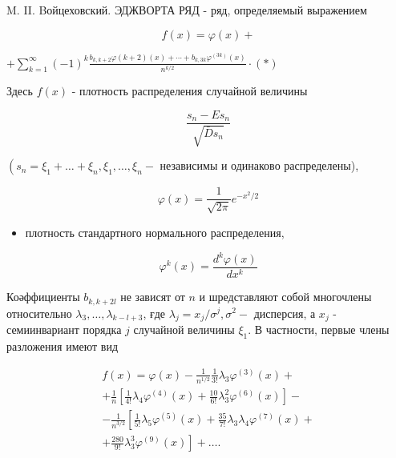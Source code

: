 \documentclass[10pt]{article}
\begin{document}
M. II. Bойцеховский. ЭДЖВОРТА РЯД - ряд, определяемый выражением



\[

f(x)=\varphi(x)+

\]



$+\sum_{k=1}^{\infty}(-1)^{k} \frac{b_{k, k+2} \varphi(k+2)(x)+\cdots+b_{k, 3 k} \varphi^{(3 k)}(x)}{n^{k / 2}} \cdot(*)$



Здесь $f(x)$ - плотность распределения случайной величины



\[

\frac{s_{n}-E s_{n}}{\sqrt{\bar{D} s_{n}}}

\]



$\left(s_{n}=\xi_{1}+\ldots+\xi_{n}, \xi_{1}, \ldots, \xi_{n}-\right.$ независимы и одинаково распределены),



\[

\varphi(x)=\frac{1}{\sqrt{2 \pi}} e^{-x^{2} / 2}

\]



\begin{itemize}

  \item плотность стандартного нормального распределения,

\end{itemize}



\[

\varphi^{k}(x)=\frac{d^{k} \varphi(x)}{d x^{k}}

\]



Коәффициенты $b_{k, k+2 l}$ не зависят от $n$ и шредставляют собой многочлены относительно $\lambda_{3}, \ldots, \lambda_{k-l+3}$, ғде $\lambda_{j}=x_{j} / \sigma^{j}, \sigma^{2}-$ дисперсия, а $x_{j}$ - семиинвариант порядка $j$ случайной величины $\xi_{1}$. В частности, первые члены разложения имеют вид



\[

\begin{gathered}

f(x)=\varphi(x)-\frac{1}{n^{1 / 2}} \frac{1}{3 !} \lambda_{3} \varphi^{(3)}(x)+ \\

+\frac{1}{n}\left[\frac{1}{4 !} \lambda_{4} \varphi^{(4)}(x)+\frac{10}{6 !} \lambda_{3}^{2} \varphi^{(6)}(x)\right]- \\

-\frac{1}{n^{3 / 2}}\left[\frac{1}{5 !} \lambda_{5} \varphi^{(5)}(x)+\frac{35}{7 !} \lambda_{3} \lambda_{4} \varphi^{(7)}(x)+\right. \\

\left.+\frac{280}{9 !} \lambda_{3}^{3} \varphi^{(9)}(x)\right]+\ldots .

\end{gathered}

\]
\end{document}

